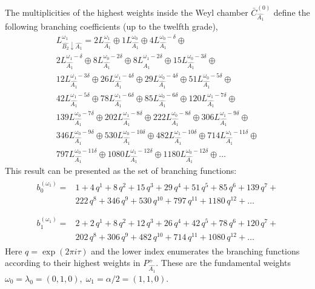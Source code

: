 \documentclass[12pt]{iopart}
\theoremstyle{definition}
\begin{document}
The multiplicities of the highest weights inside the  Weyl chamber
$\bar{C}^{\left( 0 \right)}_{\hat{A_1}}$
define the following branching coefficients (up to the twelfth grade),
\begin{eqnarray*}
  \label{eq:28}
  L^{\omega_1}_{\hat{B_2}\downarrow \hat{A_1}}=2 L_{\hat{A_1}}^{\omega_1}\oplus 1 L_{\hat{A_1}}^{\omega_0}\oplus 4 L_{\hat{A_1}}^{\omega_0-\delta}\oplus\\
    2 L_{\hat{A_1}}^{\omega_1-\delta}\oplus 8 L_{\hat{A_1}}^{\omega_0-2\delta}\oplus
    8 L_{\hat{A_1}}^{\omega_1-2\delta}\oplus 15 L_{\hat{A_1}}^{\omega_0-3\delta}\oplus\\
    12 L_{\hat{A_1}}^{\omega_1-3\delta}\oplus 26 L_{\hat{A_1}}^{\omega_1-4\delta}\oplus
    29 L_{\hat{A_1}}^{\omega_0-4\delta}\oplus 51 L_{\hat{A_1}}^{\omega_0-5\delta}\oplus\\
    42 L_{\hat{A_1}}^{\omega_1-5\delta}\oplus 78 L_{\hat{A_1}}^{\omega_1-6\delta}\oplus
    85 L_{\hat{A_1}}^{\omega_0-6\delta}\oplus 120 L_{\hat{A_1}}^{\omega_1-7\delta}\oplus\\
    139 L_{\hat{A_1}}^{\omega_0-7\delta}\oplus 202 L_{\hat{A_1}}^{\omega_1-8\delta}\oplus
    222 L_{\hat{A_1}}^{\omega_0-8\delta}\oplus 306 L_{\hat{A_1}}^{\omega_1-9\delta}\oplus\\
    346 L_{\hat{A_1}}^{\omega_0-9\delta}\oplus 530 L_{\hat{A_1}}^{\omega_0-10\delta}\oplus
    482 L_{\hat{A_1}}^{\omega_1-10\delta}\oplus 714 L_{\hat{A_1}}^{\omega_1-11\delta}\oplus\\
    797 L_{\hat{A_1}}^{\omega_0-11\delta}\oplus 1080 L_{\hat{A_1}}^{\omega_1-12\delta}\oplus
    1180 L_{\hat{A_1}}^{\omega_0-12\delta}\oplus \dots
\end{eqnarray*}
This result can be presented as the set of branching functions:
\begin{eqnarray*}
  \label{eq:29}
  \begin{array}{cc}
    b^{(\omega_1)}_{0}= & 1 + 4\,q^{1}+ 8\,q^{2}+ 15\,q^{3}+ 29\,q^{4}+ 51\,q^{5}+ 85\,q^{6}+ 139\,q^{7}+\\
     &222\,q^{8}+ 346\,q^{9}+ 530\,q^{10}+ 797\,q^{11}+ 1180\,q^{12}+\dots\\
  \end{array}\\
  \begin{array}{cc}
    b^{(\omega_1)}_{1}= &2+2\,q^{1}+8\,q^{2}+12\,q^{3}+26\,q^{4}+42\,q^{5}+78\,q^{6}+120\,q^{7}+\\
    & 202\,q^{8}+306\,q^{9}+482\,q^{10}+714\,q^{11}+1080\,q^{12}+\dots
  \end{array}
\end{eqnarray*}
Here $q=\exp (2\pi i \tau)$ and the lower index enumerates the branching functions according
to their highest weights in $P^+_{\hat{A_1}}$.
These are the fundamental weights $\omega_0=\lambda_0=(0,1,0),\; \omega_1=\alpha/2=(1,1,0)$.
\end{document}
